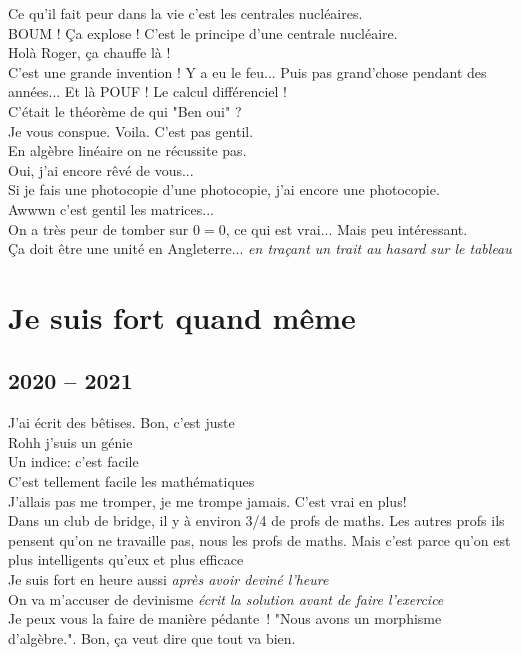 \documentclass[french, a4paper, openany]{book}
\begin{document}
	\noindent \og Ce qu'il fait peur dans la vie c'est les centrales nucléaires. \fg \\
	\og BOUM ! Ça explose ! C'est le principe d'une centrale nucléaire. \fg \\
	\og Holà Roger, ça chauffe là ! \fg \\
	\og C'est une grande invention ! Y a eu le feu... Puis pas grand'chose pendant des années... Et là POUF ! Le calcul différenciel ! \fg \\
	\og C'était le théorème de qui "Ben oui" ? \fg \\
	\og Je vous conspue. Voila. C'est pas gentil. \fg \\
	\og En algèbre linéaire on ne récussite pas. \fg \\
	\og Oui, j'ai encore rêvé de vous... \fg \\
	\og Si je fais une photocopie d'une photocopie, j'ai encore une photocopie. \fg \\
	\og Awwwn c'est gentil les matrices... \fg \\
	\og On a très peur de tomber sur $0 = 0$, ce qui est vrai... Mais peu intéressant. \fg \\
	\og Ça doit être une unité en Angleterre... \fg \emph{en traçant un trait au hasard sur le tableau} \\

\chapter{Je suis fort quand même}

\section{2020 -- 2021}

	\noindent \og J'ai écrit des bêtises. Bon, c'est juste \fg \\
	\og Rohh j'suis un génie \fg \\
	\og Un indice: c'est facile \fg \\
	\og C'est tellement facile les mathématiques \fg \\
	\og J'allais pas me tromper, je me trompe jamais. C'est vrai en plus! \fg \\
	\og Dans un club de bridge, il y à environ 3/4 de profs de maths. Les autres profs ils pensent qu'on ne travaille pas, nous les profs de maths. Mais c'est parce qu'on est plus intelligents qu'eux et plus efficace \fg \\
	\og Je suis fort en heure aussi \fg \emph{après avoir deviné l'heure} \\
	\og On va m'accuser de devinisme \fg \emph{écrit la solution avant de faire l'exercice} \\
	\og Je peux vous la faire de manière pédante~! "Nous avons un morphisme d'algèbre.". Bon, ça veut dire que tout va bien. \fg \\
	
\end{document}
